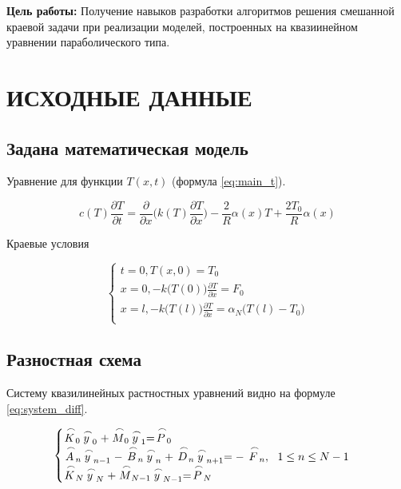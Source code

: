 \textbf{Цель работы:} Получение навыков разработки алгоритмов решения смешанной краевой задачи при реализации моделей, построенных на квазиинейном уравнении параболического типа.

\section{ИСХОДНЫЕ ДАННЫЕ}

\subsection{Задана математическая модель}

Уравнение для функции $T(x, t)$ (формула \ref{eq:main_t}).

\begin{equation}\label{eq:main_t}
    c(T) \frac{\partial T}{\partial t} = \frac{\partial}{\partial x} \bigg( k(T) \frac{\partial T}{\partial x} \bigg) - \frac{2}{R} \alpha(x) T + \frac{2T_0}{R} \alpha(x)
\end{equation}

Краевые условия

\begin{equation*}
    \begin{cases}
        t = 0, T(x, 0) = T_0 \\
        x = 0, -k \big( T(0) \big) \frac{\partial T}{\partial x} = F_0 \\
        x = l, -k \big( T(l) \big) \frac{\partial T}{\partial x} = \alpha_N \big( T(l) - T_0 \big) \\
    \end{cases}
\end{equation*}

\subsection{Разностная схема}

Систему квазилинейных растностных уравнений видно на формуле \ref{eq:system_diff}.

\begin{equation}\label{eq:system_diff}
    \begin{cases}
        \LittleCap{K}_0 \LittleCap{y}_0 + \LittleCap{M}_0 \LittleCap{y}_1 = \LittleCap{P}_0 \\
        \LittleCap{A}_n \LittleCap{y}_{n-1} - \LittleCap{B}_n \LittleCap{y}_n + \LittleCap{D}_n \LittleCap{y}_{n+1} = - \LittleCap{F}_n,\ \ 1 \le n \le N - 1 \\
        \LittleCap{K}_N \LittleCap{y}_N + \LittleCap{M}_{N-1} \LittleCap{y}_{N-1} = \LittleCap{P}_N \\
    \end{cases}
\end{equation}


